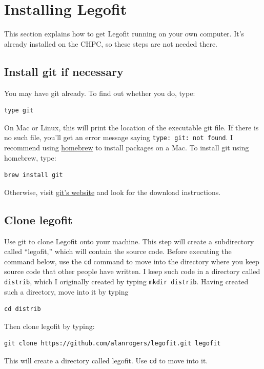 \documentclass[11pt]{article}
\begin{document}
\section{Installing Legofit}
\label{sec.install}
This section explains how to get Legofit running on your own
computer. It's already installed on the CHPC, so these steps are not
 needed there.
\subsection{Install git if necessary}
You may have git already. To find out whether you do, type:
\begin{verbatim}
type git
\end{verbatim}
On Mac or Linux, this will print the location of the executable git
file. If there is no such file, you'll get an error message saying
\verb|type: git: not found|. I recommend using
\href{https://brew.sh}{homebrew} to install packages on a Mac. To
install git using homebrew, type:
\begin{verbatim}
brew install git
\end{verbatim}
Otherwise, visit \href{https://git-scm.com}{git's website} and look
for the download instructions.

\subsection{Clone legofit}
Use git to clone Legofit onto your machine. This step will create a
subdirectory called ``legofit,'' which will contain the source
code. Before executing the command below, use the \texttt{cd} command
to move into the directory where you keep source code that other
people have written. I keep such code in a directory called
\texttt{distrib}, which I originally created by typing \texttt{mkdir
  distrib}. Having created such a directory, move into it by typing
\begin{verbatim}
cd distrib
\end{verbatim}
Then clone legofit by typing:
\begin{verbatim}
git clone https://github.com/alanrogers/legofit.git legofit
\end{verbatim}
This will create a directory called legofit. Use \texttt{cd} to move into it.
\end{document}
